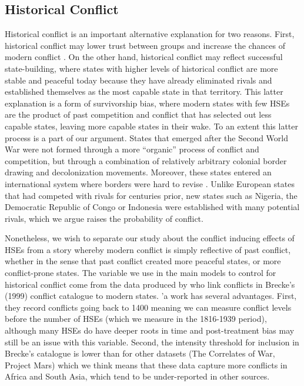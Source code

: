 \documentclass[12pt]{article}
\begin{document}
        

 \clearpage   
 
\subsection{Historical Conflict}

Historical conflict is an important alternative explanation for two reasons. First, historical conflict may lower trust between groups and increase the chances of modern conflict \citep{Besley2014}. On the other hand, historical conflict may reflect successful state-building, where states with higher levels of historical conflict are more stable and peaceful today because they have already eliminated rivals and established themselves as the most capable state in that territory. This latter explanation is a form of survivorship bias, where modern states with few HSEs are the product of past competition and conflict that has selected out less capable states, leaving more capable states in their wake. To an extent this latter process is a part of our argument. States that emerged after the Second World War were not formed through a more ``organic'' process of conflict and competition, but through a combination of relatively arbitrary colonial border drawing and decolonization movements. Moreover, these states entered an international system where borders were hard to revise \citep{Herbst2014}. Unlike European states that had competed with rivals for centuries prior, new states such as Nigeria, the Democratic Republic of Congo or Indonesia were established with many potential rivals, which we argue raises the probability of conflict. 

Nonetheless, we wish to separate our study about the conflict inducing effects of HSEs from a story whereby modern conflict is simply reflective of past conflict, whether in the sense that past conflict created more peaceful states, or more conflict-prone states. The variable we use in the main models to control for historical conflict come from the data produced by \citet{Dincecco2019} who link conflicts in Brecke's (1999) conflict catalogue to modern states. \citet{Dincecco2019}'a work has several advantages. First, they record conflicts going back to 1400 meaning we can measure conflict levels before the number of HSEs (which we measure in the 1816-1939 period), although many HSEs do have deeper roots in time and post-treatment bias may still be an issue with this variable. Second, the intensity threshold for inclusion in Brecke's catalogue is lower than for other datasets (The Correlates of War, Project Mars) which we think means that these data capture more conflicts in Africa and South Asia, which tend to be under-reported in other sources. 
\end{document}
